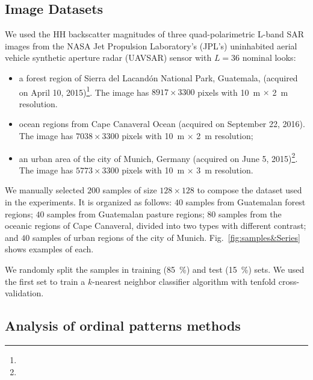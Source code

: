 \documentclass[journal]{IEEEtran}
\begin{document}
	
	\subsection{Image Datasets}
	
	We used the HH backscatter magnitudes of three quad-polarimetric L-band SAR images from the NASA Jet Propulsion Laboratory’s (JPL’s) uninhabited aerial vehicle synthetic aperture radar (UAVSAR) sensor with $L=36$ nominal looks:
	\begin{itemize}
		\item a forest region of Sierra del Lacandón National Park, Guatemala, (acquired on April 10, 2015)\footnote{}. 
		The image has $8917 \times 3300$ pixels with 
		\SI[inter-unit-product =$\cdot$]{10}{\meter} $\times$ \SI[inter-unit-product =$\cdot$]{2}{\meter} resolution.
		\item ocean regions from Cape Canaveral Ocean (acquired on September 22, 2016).
		The image has $7038 \times 3300$ pixels with 
		\SI[inter-unit-product =$\cdot$]{10}{\meter} $\times$ \SI[inter-unit-product =$\cdot$]{2}{\meter} resolution;
		\item an urban area of the city of Munich, Germany (acquired on June 5, 2015)\footnote{}.
		The image has $5773 \times 3300$ pixels with 
		\SI[inter-unit-product =$\cdot$]{10}{\meter} $\times$ \SI[inter-unit-product =$\cdot$]{3}{\meter} resolution.
	\end{itemize}
	
	We manually selected $200$ samples of size $128 \times 128$ to compose the dataset used in the experiments.
	It is organized as follows:
	$40$ samples from Guatemalan forest regions;
	$40$ samples from Guatemalan pasture regions;
	$80$ samples from the oceanic regions of Cape Canaveral, divided into two types with different contrast; and
	$40$ samples of urban regions of the city of Munich.
	Fig.~\ref{fig:samples&Series} shows examples of each.
	
	We randomly split the samples in training (\SI{85}{\percent}) and test (\SI{15}{\percent}) sets.
	We used the first set to train a $k$-nearest neighbor classifier algorithm with tenfold cross-validation.
	
	\subsection{Analysis of ordinal patterns methods}
	
\end{document}
